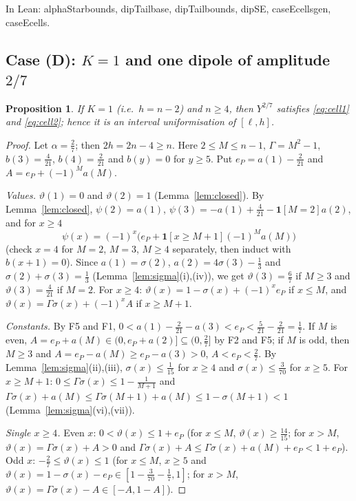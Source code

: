 \documentclass[11pt]{amsart}
\newtheorem{proposition}[lemma]{Proposition}
\theoremstyle{definition}
\theoremstyle{remark}
\numberwithin{equation}{section}
\newcommand{\ind}[1]{\mathbf{1}[#1]}
\newcommand{\leanus}{\textunderscore\allowbreak}
\newcommand{\lean}[1]{{\ttfamily\let\_\leanus #1}}
\begin{document}
In Lean: \lean{alphaStar\_bounds}, \lean{dipTail\_base}, \lean{dipTail\_bounds}, \lean{dipS\_E},
\lean{caseE\_cells\_gen}, \lean{caseE\_cells}.

\subsection{Case (D): \texorpdfstring{$K=1$}{K=1} and one dipole of amplitude \texorpdfstring{$2/7$}{2/7}}

\begin{proposition}\label{prop:caseD}
If $K=1$ (i.e.\ $h=n-2$) and $n\ge4$, then $Y^{2/7}$ satisfies \eqref{eq:cell1} and \eqref{eq:cell2};
hence it is an interval uniformisation of $[\ell,h]$.
\end{proposition}

\begin{proof}
Let $\alpha=\frac27$; then $2h=2n-4\ge n$. Here $2\le M\le n-1$, $\Gamma=M^2-1$, $b(3)=\frac4{21}$,
$b(4)=\frac2{21}$ and $b(y)=0$ for $y\ge5$. Put $e_P=a(1)-\frac2{21}$ and $A=e_P+(-1)^Ma(M)$.

\emph{Values.} $\vartheta(1)=0$ and $\vartheta(2)=1$ (Lemma~\ref{lem:closed}). By Lemma~\ref{lem:closed},
$\psi(2)=a(1)$, $\psi(3)=-a(1)+\frac4{21}-\ind{M=2}a(2)$, and for $x\ge4$
\[
  \psi(x)=(-1)^x\bigl(e_P+\ind{x\ge M+1}(-1)^Ma(M)\bigr)
\]
(check $x=4$ for $M=2$, $M=3$, $M\ge4$ separately, then induct with $b(x+1)=0$). Since $a(1)=\sigma(2)$,
$a(2)=4\sigma(3)-\frac13$ and $\sigma(2)+\sigma(3)=\frac13$ (Lemma~\ref{lem:sigma}(i),(iv)), we get
$\vartheta(3)=\frac67$ if $M\ge3$ and $\vartheta(3)=\frac4{21}$ if $M=2$. For $x\ge4$:
$\vartheta(x)=1-\sigma(x)+(-1)^xe_P$ if $x\le M$, and $\vartheta(x)=\Gamma\sigma(x)+(-1)^xA$ if $x\ge M+1$.

\emph{Constants.} By F5 and F1, $0<a(1)-\frac2{21}-a(3)<e_P<\frac5{21}-\frac2{21}=\frac17$. If $M$ is even,
$A=e_P+a(M)\in(0,e_P+a(2)]\subseteq(0,\frac27]$ by F2 and F5; if $M$ is odd, then $M\ge3$ and
$A=e_P-a(M)\ge e_P-a(3)>0$, $A<e_P<\frac27$. By Lemma~\ref{lem:sigma}(ii),(iii), $\sigma(x)\le\frac1{15}$ for
$x\ge4$ and $\sigma(x)\le\frac3{70}$ for $x\ge5$. For $x\ge M+1$: $0\le\Gamma\sigma(x)\le1-\frac1{M+1}$ and
$\Gamma\sigma(x)+a(M)\le\Gamma\sigma(M+1)+a(M)\le1-\sigma(M+1)<1$ (Lemma~\ref{lem:sigma}(vi),(vii)).

\emph{Single $x\ge4$.} Even $x$: $0<\vartheta(x)\le1+e_P$ (for $x\le M$, $\vartheta(x)\ge\frac{14}{15}$; for
$x>M$, $\vartheta(x)=\Gamma\sigma(x)+A>0$ and $\Gamma\sigma(x)+A\le\Gamma\sigma(x)+a(M)+e_P<1+e_P$). Odd $x$:
$-\frac27\le\vartheta(x)\le1$ (for $x\le M$, $x\ge5$ and $\vartheta(x)=1-\sigma(x)-e_P\in[1-\frac3{70}-\frac17,1]$;
for $x>M$, $\vartheta(x)=\Gamma\sigma(x)-A\in[-A,1-A]$).


\end{proof}
\end{document}
